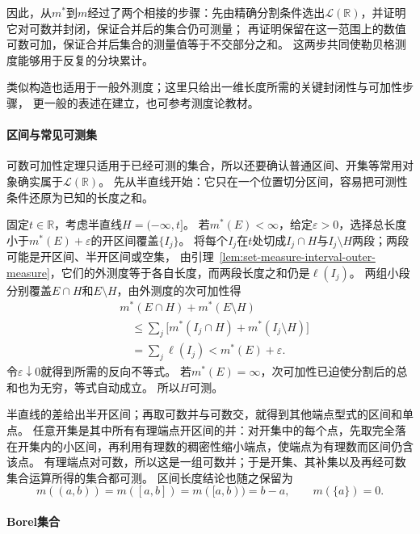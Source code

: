 因此，从$m^*$到$m$经过了两个相接的步骤：先由精确分割条件选出$\mathcal L(\mathbb R)$，并证明它对可数并封闭，保证合并后的集合仍可测量；
再证明保留在这一范围上的数值可数可加，保证合并后集合的测量值等于不交部分之和。
这两步共同使勒贝格测度能够用于反复的分块累计。

类似构造也适用于一般外测度；这里只给出一维长度所需的关键封闭性与可加性步骤，
更一般的表述在建立，也可参考测度论教材。

\paragraph{区间与常见可测集}

可数可加性定理只适用于已经可测的集合，所以还要确认普通区间、开集等常用对象确实属于$\mathcal L(\mathbb R)$。
先从半直线开始：它只在一个位置切分区间，容易把可测性条件还原为已知的长度之和。

固定$t\in\mathbb R$，考虑半直线$H=(-\infty,t]$。
若$m^*(E)<\infty$，给定$\varepsilon>0$，选择总长度小于$m^*(E)+\varepsilon$的开区间覆盖$\{I_j\}$。
将每个$I_j$在$t$处切成$I_j\cap H$与$I_j\setminus H$两段；两段可能是开区间、半开区间或空集，
由引理~\ref{lem:set-measure-interval-outer-measure}，它们的外测度等于各自长度，而两段长度之和仍是$\ell(I_j)$。
两组小段分别覆盖$E\cap H$和$E\setminus H$，由外测度的次可加性得
\[
 \begin{aligned}
 &m^*(E\cap H)+m^*(E\setminus H)\\
 &\quad\leq\sum_j\bigl[m^*(I_j\cap H)+m^*(I_j\setminus H)\bigr]\\
 &\quad=\sum_j\ell(I_j)<m^*(E)+\varepsilon.
 \end{aligned}
\]
令$\varepsilon\downarrow0$就得到所需的反向不等式。
若$m^*(E)=\infty$，次可加性已迫使分割后的总和也为无穷，等式自动成立。
所以$H$可测。

半直线的差给出半开区间；再取可数并与可数交，就得到其他端点型式的区间和单点。
任意开集是其中所有有理端点开区间的并：对开集中的每个点，先取完全落在开集内的小区间，再利用有理数的稠密性缩小端点，使端点为有理数而区间仍含该点。
有理端点对可数，所以这是一组可数并；于是开集、其补集以及再经可数集合运算所得的集合都可测。
区间长度结论也随之保留为
\[
 m((a,b))=m([a,b])=m([a,b))=b-a,\qquad m(\{a\})=0.
\]

\paragraph{Borel集合}

